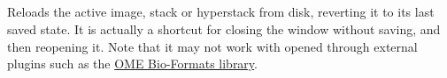 

\subsection{\protect{}\label{sub:Revert[r]}}

Reloads the active image, stack or hyperstack
from disk, reverting it to its last saved state. It is actually a
shortcut for closing the window without saving, and then reopening
it. Note that it may not work with 
opened through external plugins such as the \href{http://loci.wisc.edu/software/bio-formats}{OME Bio-Formats library}.




\subsection{\protect{}\label{sub:Page-Setup...}}

